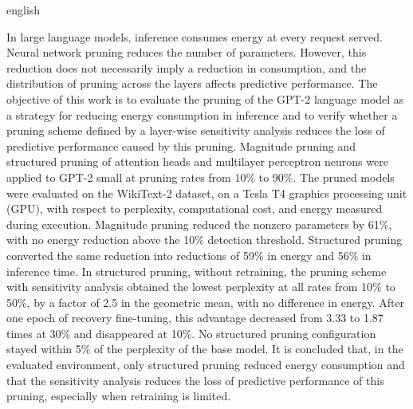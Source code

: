 \begin{resumo}[Abstract]
 \begin{otherlanguage*}{english}

In large language models, inference consumes energy at every request served. Neural network
pruning reduces the number of parameters. However, this reduction does not
necessarily imply a reduction in consumption, and the distribution of pruning across the
layers affects predictive performance. The objective of this work is to evaluate the pruning of the \mbox{GPT-2} language model as a
strategy for reducing energy consumption in inference and to verify whether a pruning scheme
defined by a layer-wise sensitivity analysis reduces the loss of predictive performance caused
by this pruning. Magnitude pruning and structured pruning of attention heads and multilayer
perceptron neurons were applied to \mbox{GPT-2} small at pruning rates from 10\% to 90\%. The pruned
models were evaluated on the \mbox{WikiText-2} dataset, on a Tesla T4 graphics processing unit (GPU), with respect to
perplexity, computational cost, and energy measured during execution. Magnitude pruning
reduced the nonzero parameters by 61\%, with no energy reduction above the 10\% detection
threshold. Structured pruning converted the same reduction into reductions of 59\%
in energy and 56\% in inference time. In structured pruning, without retraining, the pruning
scheme with sensitivity analysis obtained the lowest perplexity at all rates from 10\% to
50\%, by a factor of 2.5 in the geometric mean, with no difference in energy. After one epoch
of recovery fine-tuning, this advantage decreased from 3.33 to 1.87 times at 30\% and
disappeared at 10\%. No structured pruning configuration stayed within 5\% of the perplexity
of the base model. It is concluded that, in the evaluated environment, only
structured pruning reduced energy consumption and that the sensitivity analysis reduces the
loss of predictive performance of this pruning, especially when retraining is limited.

   \vspace{\onelineskip}
 \end{otherlanguage*}
\end{resumo}

